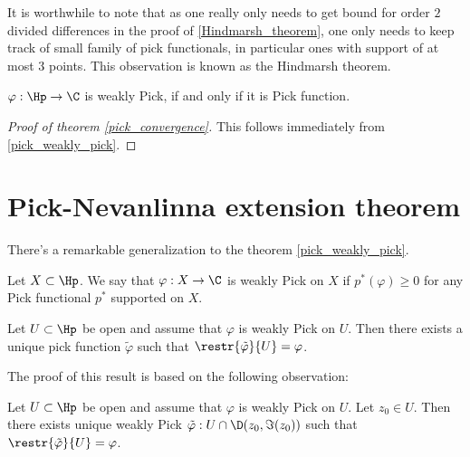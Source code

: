 It is worthwhile to note that as one really only needs to get bound for order $2$ divided differences in the proof of \ref{Hindmarsh_theorem}, one only needs to keep track of small family of pick functionals, in particular ones with support of at most $3$ points. This observation is known as the Hindmarsh theorem.

\begin{kor}\label{pick_weakly_pick}
	$\varphi : \Hp \to \C$ is weakly Pick, if and only if it is Pick function.
\end{kor}

\begin{proof}[Proof of theorem \ref{pick_convergence}]
	This follows immediately from \ref{pick_weakly_pick}.
\end{proof}

\section{Pick-Nevanlinna extension theorem}

There's a remarkable generalization to the theorem \ref{pick_weakly_pick}.

\begin{maar}
	Let $X \subset \Hp$. We say that $\varphi : X \to \C$ is weakly Pick on $X$ if $p^{*}(\varphi) \geq 0$ for any Pick functional $p^{*}$ supported on $X$.
\end{maar}

\begin{lause}\label{open_pick_interpolation}
	Let $U \subset \Hp$ be open and assume that $\varphi$ is weakly Pick on $U$. Then there exists a unique pick function $\tilde{\varphi}$ such that $\restr{\tilde{\varphi}}{U} = \varphi$.
\end{lause}

The proof of this result is based on the following observation:

\begin{lem}\label{open_pick_lemma}
	Let $U \subset \Hp$ be open and assume that $\varphi$ is weakly Pick on $U$. Let $z_{0} \in U$. Then there exists unique weakly Pick $\tilde{\varphi} : U \cap \D(z_{0}, \Im(z_{0}))$ such that $\restr{\tilde{\varphi}}{U} = \varphi$.
\end{lem}

